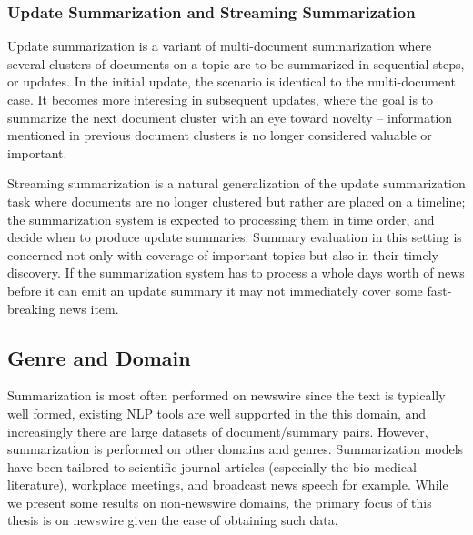 \subsubsection{Update Summarization and Streaming Summarization}

Update summarization is a variant of multi-document summarization where
several clusters of documents on a topic are to be summarized in sequential
steps, or updates. In the initial update, the scenario is identical to the 
multi-document case. It becomes more interesing in subsequent updates,
where the goal is to summarize the next document cluster with an eye toward
novelty -- information mentioned in previous document clusters is no longer 
considered valuable or important. 

Streaming summarization is a natural generalization of the update summarization
task where documents are no longer clustered but rather are placed on a 
timeline; the summarization system is expected to processing them in 
time order, and decide when to produce update summaries. 
Summary evaluation in this setting is concerned not only with coverage of
important topics but also in their timely discovery. If the summarization
system has to process a whole days worth of news before it can emit 
an update summary it may not immediately cover some fast-breaking news item.












\subsection{Genre and Domain}
Summarization is most often performed on newswire since the text is 
typically well formed, existing NLP tools are well supported in the this 
domain, and increasingly there are large datasets of document/summary pairs.
However, summarization is performed on other domains and genres. 
Summarization models have been tailored to scientific
journal articles (especially the bio-medical literature), workplace meetings,
and broadcast news speech for example.
While we present some results on non-newswire domains, the primary 
focus of this thesis is on newswire given the ease of obtaining such data. 



